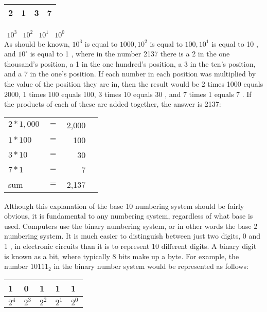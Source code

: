 \documentclass[10pt]{article}
\begin{document}
\begin{center}
\begin{tabular}{|l|l|l|l|}
\hline
2 & 1 & 3 & 7 \\
\hline
\end{tabular}
\end{center}

$\begin{array}{llll}10^{3} & 10^{2} & 10^{1} & 10^{0}\end{array}$\\
As should be known, $10^{3}$ is equal to $1000,10^{2}$ is equal to $100,10^{1}$ is equal to 10 , and $10^{\circ}$ is equal to 1 , where in the number 2137 there is a 2 in the one thousand's position, a 1 in the one hundred's position, a 3 in the ten's position, and a 7 in the one's position. If each number in each position was multiplied by the value of the position they are in, then the result would be 2 times 1000 equals 2000, 1 times 100 equals 100, 3 times 10 equals 30 , and 7 times 1 equals 7 . If the products of each of these are added together, the answer is 2137:

\begin{center}
\begin{tabular}{llrr}
$2 * 1,000$ & $=$ & 2,000 \\
$1 * 100$ & $=$ & 100 \\
$3 * 10$ & $=$ & 30 \\
$7 * 1$ & $=$ & 7 \\
\hline
sum & $=$ & 2,137 \\
\hline
\end{tabular}
\end{center}

Although this explanation of the base 10 numbering system should be fairly obvious, it is fundamental to any numbering system, regardless of what base is used. Computers use the binary numbering system, or in other words the base 2 numbering system. It is much easier to distinguish between just two digits, 0 and 1 , in electronic circuits than it is to represent 10 different digits. A binary digit is known as a bit, where typically 8 bits make up a byte. For example, the number $10111_{2}$ in the binary number system would be represented as follows:

\begin{center}
\begin{tabular}{|l|l|l|l|l|}
\hline
1 & 0 & 1 & 1 & 1 \\
\hline
$2^{4}$ & $2^{3}$ & $2^{2}$ & $2^{1}$ & $2^{0}$ \\
\hline
\end{tabular}
\end{center}
\end{document}

